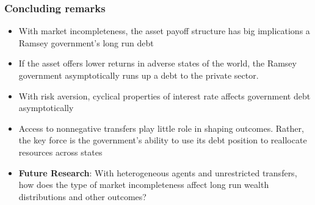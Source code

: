 \documentclass{beamer}
\begin{document}
 \begin{frame}
  \frametitle{Concluding remarks }
\begin{itemize}
	\item With market incompleteness, the asset payoff structure  has big implications a Ramsey government's  long run debt
	\item If the asset offers lower returns in adverse states of the world, the Ramsey government  asymptotically runs up a  debt to the private sector.
\item With risk aversion, cyclical properties of interest rate affects government debt asymptotically
	\item  Access to nonnegative transfers play little role in shaping outcomes.  Rather, the key  force is the government's ability to use its debt position to reallocate resources across states
	\item  \textbf{Future Research}:   With heterogeneous agents and unrestricted transfers, how does the type of market incompleteness affect long run wealth distributions and other outcomes?
\end{itemize}
 \end{frame}

  
\end{document}
